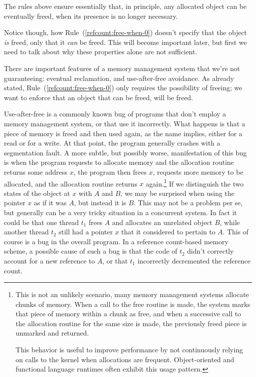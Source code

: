 The rules above ensure essentially that, in principle, any allocated object can be eventually freed, when its presence is no longer necessary.

Notice though, how Rule~(\ref{refcount:free-when-0}) doesn't specify that the object \emph{is} freed, only that it \emph{can} be freed.
This will become important later, but first we need to talk about why these properties alone are not sufficient.

There are important features of a memory management system that we're not guaranteeing: eventual reclamation, and use-after-free avoidance.
As already stated, Rule~(\ref{refcount:free-when-0}) only requires the possibility of freeing; we want to enforce that an object that can be freed, will be freed.

Use-after-free is a commonly known bug of programs that don't employ a memory management system, or that use it incorrectly.
What happens is that a piece of memory is freed and then used again, as the name implies, either for a read or for a write.
At that point, the program generally crashes with a segmentation fault.
A more subtle, but possibly worse, manifestation of this bug is when the program requests to allocate memory and the allocation routine returns some address $x$, the program then frees $x$, requests more memory to be allocated, and the allocation routine returns $x$ again.\footnote{%
	This is not an unlikely scenario, many memory management systems allocate chunks of memory.
	When a call to the free routine is made, the system marks that piece of memory within a chunk as free, and when a successive call to the allocation routine for the same size is made, the previously freed piece is unmarked and returned.
	
	This behavior is useful to improve performance by not continuously relying on calls to the kernel when allocations are frequent.
	Object-oriented and functional language runtimes often exhibit this usage pattern.
}
If we distinguish the two states of the object at $x$ with $A$ and $B$, we may be surprised when using the pointer $x$ as if it was $A$, but instead it is $B$.
This may not be a problem per se, but generally can be a very tricky situation in a concurrent system.
In fact it could be that one thread $t_1$ frees $A$ and allocates an unrelated object $B$, while another thread $t_2$ still had a pointer $x$ that it considered to pertain to $A$.
This of course is a bug in the overall program.
In a reference count-based memory scheme, a possible cause of such a bug is that the code of $t_2$ didn't correctly account for a new reference to $A$, or that $t_1$ incorrectly decremented the reference count.

